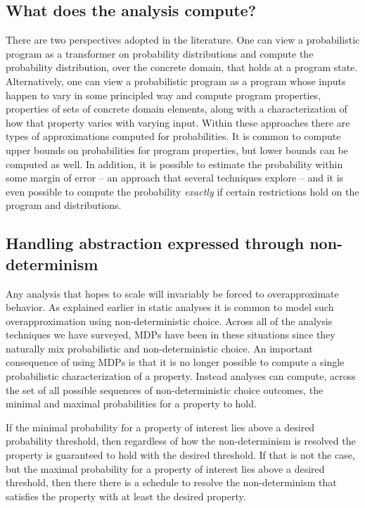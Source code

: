 \subsection{What does the analysis compute?}
There are two perspectives adopted in the literature.
One can view a probabilistic program as a transformer on probability
distributions and compute the probability distribution, over the
concrete domain, that holds at a program state.
Alternatively, one can view a probabilistic program as a program 
whose inputs happen
to vary in some principled way and compute program properties, 
properties of sets of concrete domain elements, along with a characterization
of how that property varies with varying input.
Within these approaches there are types of approximations
computed for probabilities.  It is common to compute upper bounds
on probabilities for program properties, but lower bounds can 
be computed as well.  In addition, it is possible to estimate the
probability within some margin of error -- an approach that several
techniques explore -- and it is even possible to compute the probability
\textit{exactly} if certain restrictions hold on the program and distributions.



\subsection{Handling abstraction expressed through non-determinism}
Any analysis that hopes to scale will invariably be forced to overapproximate
behavior.  As explained earlier in static analyses it is common
to model such overapproximation using non-deterministic choice.
Across all of the analysis techniques we have surveyed, MDPs
have been in these situations since they naturally mix probabilistic
and non-deterministic choice.   
An important consequence of using MDPs is that it is no longer possible
to compute a single probabilistic characterization of a property.
Instead analyses can compute, across the set of all possible sequences
of non-deterministic choice outcomes, the minimal and maximal 
probabilities for a property to hold.

If the minimal probability for a property of interest lies above 
a desired probability threshold, then regardless of how the non-determinism
is resolved the property is guaranteed to hold with the desired 
threshold.  If that is not the case, but the maximal probability for
a property of interest lies above a desired threshold, then there
there is a schedule to resolve the non-determinism that satisfies
the property with at least the desired property.

